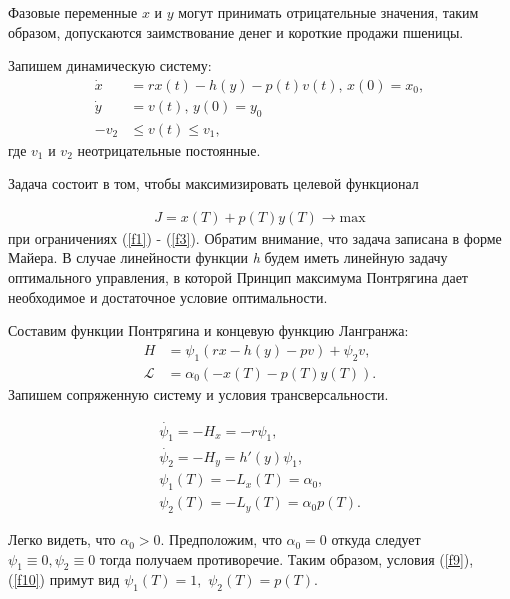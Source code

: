 Фазовые переменные $x$ и $y$ могут принимать отрицательные значения, таким образом, допускаются заимствование денег и короткие продажи пшеницы.



Запишем динамическую систему:
\begin{align}
    \Dot{x} & = r x(t) - h(y) - p(t) v(t),\, x(0) = x_{0}, \label{f1} \\
    \Dot{y} & = v(t), \, y(0) = y_{0} \label{f2}\\
    - v_2 & \le v(t) \le v_1, \label{f3}
\end{align}    
где $v_{1}$ и ${v_2}$ неотрицательные постоянные. 

Задача состоит в том, чтобы максимизировать целевой функционал

\begin{align}
    J = x(T) + p(T) y(T)\to \mathrm{max}
\end{align} 
при ограничениях (\ref{f1}) - (\ref{f3}). Обратим внимание, что задача записана в форме Майера. В случае линейности функции  \emph{h} будем иметь линейную задачу оптимального управления, в которой Принцип максимума Понтрягина дает необходимое и достаточное условие оптимальности.


Составим функции Понтрягина и концевую функцию Лангранжа: 
\begin{align}
    {H} & = \psi_{1} (r x - h(y) - p v) + \psi_{2} v,\\
    \mathcal{L} & = \alpha_{0} (-x(T) - p(T) y(T)).
\end{align} 
Запишем сопряженную систему и условия трансверсальности.

\begin{gather}
 \Dot{\psi_{1}} = -H_x = -r \psi_{1},\label{f7}\\
\Dot{\psi_{2}} = -H_y = h'(y) \psi_{1},\label{f8}\\ 
    {\psi_{1}(T)} = - {L}_x(T)=\alpha_{0},\label{f9}\\
    {\psi_{2}(T)} = - {L}_y(T)=\alpha_{0} p(T) \label{f10}.
\end{gather} 

Легко видеть, что $\alpha_{0} > 0 $. Предположим, что $ \alpha_{0} = 0$ откуда следует\\ $\psi_{1} \equiv 0, \psi_{2} \equiv 0 $ тогда получаем противоречие. Таким образом, условия (\ref{f9}), (\ref{f10})  примут вид $\psi_1(T) =1,$  $\psi_2(T)=p(T)$.

